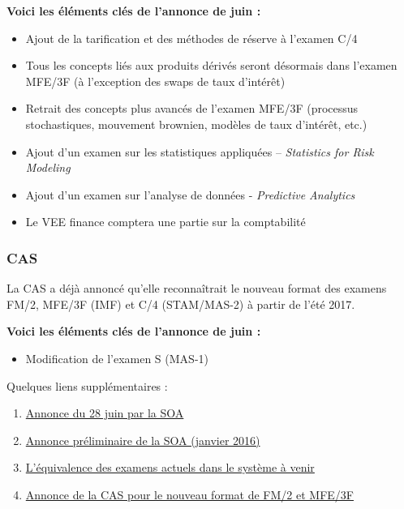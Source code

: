 \textbf{Voici les éléments clés de l’annonce de juin :}
\begin{itemize}
\item Ajout de la tarification et des méthodes de réserve à l’examen C/4
\item Tous les concepts liés aux produits dérivés seront désormais dans l'examen MFE/3F (à l'exception des swaps de taux d'intérêt)
\item Retrait des concepts plus avancés de l’examen MFE/3F (processus stochastiques, mouvement brownien, modèles de taux d’intérêt, etc.)
\item Ajout d’un examen sur les statistiques appliquées – \emph{Statistics for Risk Modeling}  
\item Ajout d’un examen sur l’analyse de données - \emph{Predictive Analytics}
\item Le VEE finance comptera une partie sur la comptabilité 
\end{itemize}
\vspace{\baselineskip} 

\subsubsection*{CAS}
La CAS a déjà annoncé qu’elle reconnaîtrait le nouveau format des examens FM/2, MFE/3F (IMF) et C/4 (STAM/MAS-2) à partir de l’été 2017. 

\textbf{Voici les éléments clés de l’annonce de juin :}
\begin{itemize}
\item Modification de l'examen S (MAS-1) 
\end{itemize}
\vspace{\baselineskip} 

Quelques liens supplémentaires :
\begin{enumerate}
\item \href{https://www.soa.org/Education/General-Info/2016-asa-cera-curriculum-changes.aspx}{Annonce du 28 juin par la SOA}
\item \href{https://soa.qualtrics.com/CP/File.php?F=F_0TDd9bj143TrCW9}{Annonce préliminaire de la SOA (janvier 2016)}
\item \href{https://www.soa.org/Education/General-Info/2016-transition-rules-asa-candidated.aspx}{L’équivalence des examens actuels dans le système à venir}
\item \href{http://www.casact.org/press/index.cfm?fa=viewArticle&articleID=3273}{Annonce de la CAS pour le nouveau format de FM/2 et MFE/3F}
\end{enumerate}

